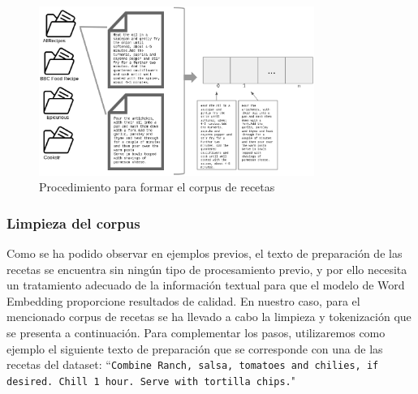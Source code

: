 \begin{figure}[H]
    \centering
  \includegraphics[width=0.8\textwidth]{imagenes/creacion-corpus-gris.png}
  \caption{Procedimiento para formar el corpus de recetas}
  \label{fig:creacion-corpus}
\end{figure}


\subsubsection{Limpieza del corpus}

Como se ha podido observar en ejemplos previos, el texto de preparación de las recetas se encuentra sin ningún tipo de procesamiento previo, y por ello necesita un tratamiento adecuado de la información textual para que el modelo de Word Embedding proporcione resultados de calidad. En nuestro caso, para el mencionado corpus de recetas se ha llevado a cabo la limpieza y tokenización que se presenta a continuación. Para complementar los pasos, utilizaremos como ejemplo el siguiente texto de preparación que se corresponde con una de las recetas del dataset: ``\texttt{Combine Ranch, salsa, tomatoes and chilies, if desired. Chill 1 hour. Serve with tortilla chips.}"

